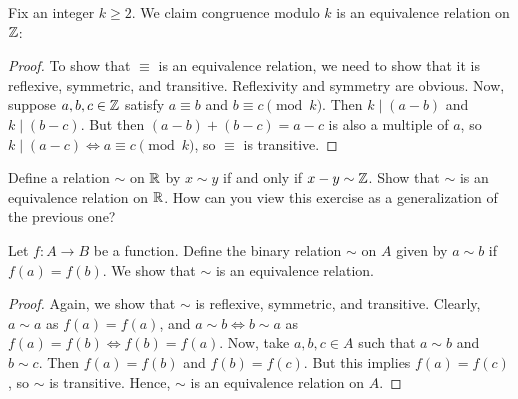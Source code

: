 \documentclass{article}
\begin{document}
\begin{example}
Fix an integer $k\geq 2$. We claim congruence modulo $k$ is an equivalence relation on $\mathbb Z$:
\end{example}
\begin{proof}
To show that $\equiv$ is an equivalence relation, we need to show that it is reflexive, symmetric, and transitive. Reflexivity and symmetry are obvious. Now, suppose $a,b,c\in\mathbb Z$ satisfy $a\equiv b$ and $b\equiv c\pmod k$. Then $k\mid (a-b)$ and $k\mid (b-c)$. But then $(a-b)+(b-c) = a-c$ is also a multiple of $a$, so $k\mid (a-c) \iff a\equiv c\pmod k$, so $\equiv$ is transitive.
\end{proof}

\begin{exercise}
Define a relation $\sim$ on $\mathbb R$ by $x\sim y$ if and only if $x-y\sim \mathbb Z$. Show that $\sim$ is an equivalence relation on $\mathbb R$. How can you view this exercise as a generalization of the previous one?
\end{exercise}

\newpage
\begin{example}
Let $f: A\to B$ be a function. Define the binary relation $\sim$ on $A$ given by $a\sim b$ if $f(a) = f(b)$. We show that $\sim$ is an equivalence relation.
\end{example}
\begin{proof}
Again, we show that $\sim$ is reflexive, symmetric, and transitive. Clearly, $a\sim a$ as $f(a) = f(a)$, and $a\sim b \iff b\sim a$ as $f(a) = f(b) \iff f(b) = f(a)$. Now, take $a,b,c\in A$ such that $a\sim b$ and $b\sim c$. Then $f(a) = f(b)$ and $f(b) = f(c)$. But this implies $f(a) = f(c)$, so $\sim$ is transitive. Hence, $\sim$ is an equivalence relation on $A$.
\end{proof}
\end{document}

